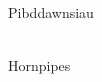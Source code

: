 \begin{multicols}{2}
    \Huge{Pibddawnsiau}\\
    \vspace{1cm}\\
    \normalsize{
      \noindent 
      \blindtext
    }

    \newcolumn

    \Huge{Hornpipes}\\
    \vspace{1cm}\\
    \normalsize{
      \noindent
      \blindtext
    }

    \end{multicols}